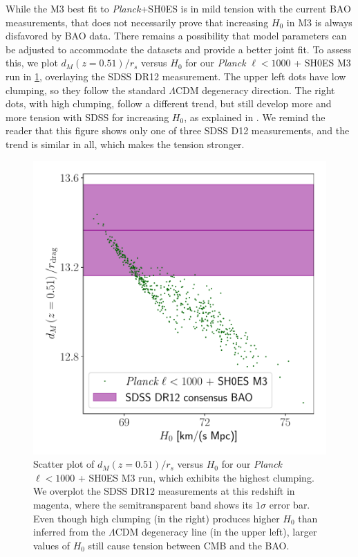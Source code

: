 While the M3 best fit to {\it Planck}+SH0ES is in mild tension with the current BAO measurements, that
does not necessarily prove that increasing $H_0$ in M3 is always disfavored by BAO data.
There remains a possibility that model parameters can be adjusted to accommodate the datasets and provide a better joint fit.
To assess this, we plot $d_M(z=0.51)/r_s$ versus $H_0$ for our {\it Planck} $\ell<1000$ + SH0ES M3 run in \cref{fig:BAO-scatter}, overlaying the SDSS DR12 measurement.
The upper left dots have low clumping, so they follow the standard $\Lambda$CDM degeneracy direction.
The right dots, with high clumping, follow a different trend, but still develop more and more tension with SDSS for increasing $H_0$, as explained in \citet{sound-horizon-not-enough}.
We remind the reader that this figure shows only one of three SDSS D12 measurements, and the trend is similar in all, which makes the tension stronger.

\begin{figure}[htp!]
\includegraphics[width=\columnwidth]{img/BAO-scatter.pdf}
\caption[Transverse comoving distance versus Hubble parameter for the clumping model with {\it Planck} $\ell<1000$ + SH0ES data]{Scatter plot of $d_M(z=0.51)/r_s$ versus $H_0$ for our {\it Planck} $\ell<1000$ + SH0ES M3 run, which exhibits the highest clumping.
We overplot the SDSS DR12 measurements at this redshift in magenta, where the semitransparent band shows its $1\sigma$ error bar.
Even though high clumping (in the right) produces higher $H_0$ than inferred from the $\Lambda$CDM degeneracy line (in the upper left), larger values of $H_0$ still cause tension between CMB and the BAO.}
\label{fig:BAO-scatter}
\end{figure}


